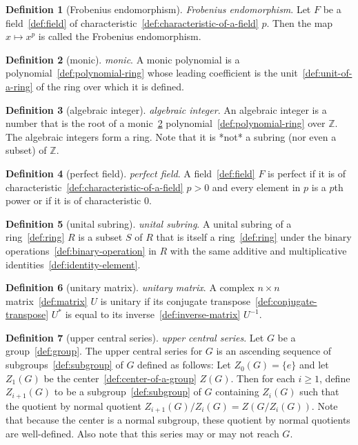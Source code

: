\documentclass[12pt,a4paper]{article}
\theoremstyle{definition}
\newtheorem{definition}{Definition}
\begin{document}
\begin{definition}[Frobenius endomorphism]\label{def:frobenius-endomorphism}
\emph{Frobenius endomorphism}. Let $F$ be a field~\ref{def:field} of characteristic~\ref{def:characteristic-of-a-field} $p$. Then the map $x\mapsto x^p$ is called the Frobenius endomorphism.
\end{definition}

\begin{definition}[monic]\label{def:monic}
\emph{monic}. A monic polynomial is a polynomial~\ref{def:polynomial-ring} whose leading coefficient is the unit~\ref{def:unit-of-a-ring} of the ring over which it is defined.
\end{definition}

\begin{definition}[algebraic integer]\label{def:algebraic-integer}
\emph{algebraic integer}. An algebraic integer is a number that is the root of a monic~\ref{def:monic} polynomial~\ref{def:polynomial-ring} over $\mathbb Z$. The algebraic integers form a ring. Note that it is *not* a subring (nor even a subset) of $\mathbb Z$.
\end{definition}

\begin{definition}[perfect field]\label{def:perfect-field}
\emph{perfect field}. A field~\ref{def:field} $F$ is perfect if it is of characteristic~\ref{def:characteristic-of-a-field} $p>0$ and every element in $p$ is a $p$th power or if it is of characteristic $0$.
\end{definition}

\begin{definition}[unital subring]\label{def:unital-subring}
\emph{unital subring}. A unital subring of a ring~\ref{def:ring} $R$ is a subset $S$ of $R$ that is itself a ring~\ref{def:ring} under the binary operations~\ref{def:binary-operation} in $R$ with the same additive and multiplicative identities~\ref{def:identity-element}.
\end{definition}

\begin{definition}[unitary matrix]\label{def:unitary-matrix}
\emph{unitary matrix}. A complex $n\times n$ matrix~\ref{def:matrix} $U$ is unitary if its conjugate transpose~\ref{def:conjugate-transpose} $U^*$ is equal to its inverse~\ref{def:inverse-matrix} $U^{-1}$.
\end{definition}

\begin{definition}[upper central series]\label{def:upper-central-series}
\emph{upper central series}. Let $G$ be a group~\ref{def:group}. The upper central series for $G$ is an ascending sequence of subgroups~\ref{def:subgroup} of $G$ defined as follows: Let $Z_0(G) = \{e\}$ and let $Z_1(G)$ be the center~\ref{def:center-of-a-group} $Z(G)$. Then for each $i\geq 1$, define $Z_{i+1}(G)$ to be a subgroup~\ref{def:subgroup} of $G$ containing $Z_i(G)$ such that the quotient by normal quotient $Z_{i+1}(G)/Z_i(G) = Z(G/Z_i(G))$.  Note that because the center is a normal subgroup, these quotient by normal quotients are well-defined. Also note that this series may or may not reach $G$.
\end{definition}
\end{document}
